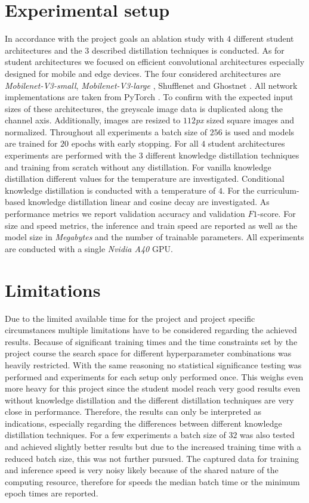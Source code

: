 \documentclass{article}
\begin{document}
\section{Experimental setup}
In accordance with the project goals an ablation study with $ 4 $ different student architectures and the $ 3 $ described distillation techniques is conducted. As for student architectures we focused on efficient convolutional architectures especially designed for mobile and edge devices. The four considered architectures are \textit{Mobilenet-V3-small}, \textit{Mobilenet-V3-large} \cite{mobilenetv3}, Shufflenet \cite{shufflenet} and Ghostnet \cite{han2020ghostnet}. All network implementations are taken from PyTorch \cite{pytorch}. To confirm with the expected input sizes of these architectures, the greyscale image data is duplicated along the channel axis. Additionally, images are resized to $ 112 $\textit{px} sized square images and normalized. Throughout all experiments a batch size of $ 256 $ is used and models are trained for $ 20 $ epochs with early stopping. For all $ 4 $ student architectures experiments are performed with the $ 3 $ different knowledge distillation techniques and training from scratch without any distillation. For vanilla knowledge distillation different values for the temperature are investigated. Conditional knowledge distillation is conducted with a temperature of $ 4 $. For the curriculum-based knowledge distillation linear and cosine decay are investigated.
As performance metrics we report validation accuracy and validation $ F1 $-score. For size and speed metrics, the inference and train speed are reported as well as the model size in \textit{Megabytes} and the number  of trainable parameters.
All experiments are conducted with a single \textit{Nvidia A40} GPU. 
\section{Limitations}
Due to the limited available time for the project and project specific circumstances multiple limitations have to be considered regarding the achieved results. Because of significant training times and the time constraints set by the project course the search space for different hyperparameter combinations was heavily restricted. With the same reasoning no statistical significance testing was performed and experiments for each setup only performed once. This weighs even more heavy for this project since the student model reach very good results even without knowledge distillation and the different distillation techniques are very close in performance. Therefore, the results can only be interpreted as indications, especially regarding the differences between different knowledge distillation techniques.
For a few experiments a batch size of $ 32 $ was also tested and achieved slightly better results but due to the increased training time with a reduced batch size, this was not further pursued.
The captured data for training and inference speed is very noisy likely because of the shared nature of the computing resource, therefore for speeds the median batch time or the minimum epoch times are reported.
\end{document}

